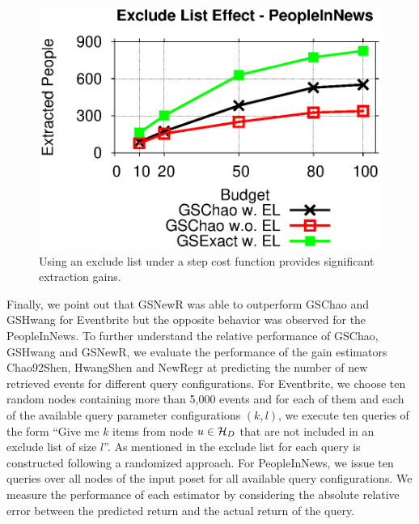 \begin{figure}[h]
	\begin{center}
	\includegraphics[clip,scale=0.5]{figs/exEffect.eps}
	\caption{Using an exclude list under a step cost function provides significant extraction gains.}
	\label{fig:exEffect}
	\end{center}
	\vspace{-20pt}
\end{figure}

\vspace{3pt}
Finally, we point out that GSNewR was able to outperform GSChao and GSHwang for Eventbrite but the opposite behavior was observed for the PeopleInNews. To further understand the relative performance of GSChao, GSHwang and GSNewR, we evaluate the performance of the gain estimators Chao92Shen, HwangShen and NewRegr at predicting the number of new retrieved events for different query configurations. For Eventbrite, we choose ten random nodes containing more than 5,000 events and for each of them and each of the available query parameter configurations $(k,l)$, we execute ten queries of the form ``Give me $k$ items from node $u \in \mathcal{H}_D$ that are not included in an exclude list of size $l$''. As mentioned in  the exclude list for each query is constructed following a randomized approach.  For PeopleInNews, we issue ten queries over all nodes of the input poset for all available query configurations.  We measure the performance of each estimator by considering the absolute relative error between the predicted return and the actual return of the query. 

